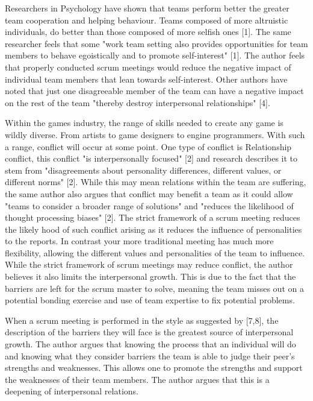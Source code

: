 \documentclass{scrartcl}
\begin{document}
Researchers in Psychology have shown that teams perform better the greater team cooperation and helping behaviour. Teams composed of more altruistic individuals, do better than those composed of more selfish ones [1].  The same researcher feels that some "work team setting also provides opportunities for team members to behave egoistically and to promote self-interest" [1]. The author feels that properly conducted scrum meetings would reduce the negative impact of individual team members that lean towards self-interest. Other authors have noted that just one disagreeable member of the team can have a negative impact on the rest of the team "thereby destroy interpersonal relationships" [4].

Within the games industry, the range of skills needed to create any game is wildly diverse. From artists to game designers to engine programmers. With such a range, conflict will occur at some point. One type of conflict is Relationship conflict, this conflict "is interpersonally focused" [2] and research describes it to stem from "disagreements about personality differences, different values, or different norms" [2]. While this may mean relations within the team are suffering, the same author also argues that conflict may benefit a team as it could allow "teams to consider a broader range of solutions" and "reduces the likelihood of thought processing biases" [2]. The strict framework of a scrum meeting reduces the likely hood of such conflict arising as it reduces the influence of personalities to the reports. In contrast your more traditional meeting has much more flexibility, allowing the different values and personalities of the team to influence. While the strict framework of scrum meetings may reduce conflict, the author believes it also limits the interpersonal growth. This is due to the fact that the barriers are left for the scrum master to solve, meaning the team misses out on a potential bonding exercise and use of team expertise to fix potential problems.

When a scrum meeting is performed in the style as suggested by [7,8], the description of the barriers they will face is the greatest source of interpersonal growth. The author argues that knowing the process that an individual will do and knowing what they consider barriers the team is able to judge their peer’s strengths and weaknesses. This allows one to promote the strengths and support the weaknesses of their team members. The author argues that this is a deepening of interpersonal relations.
\end{document}
